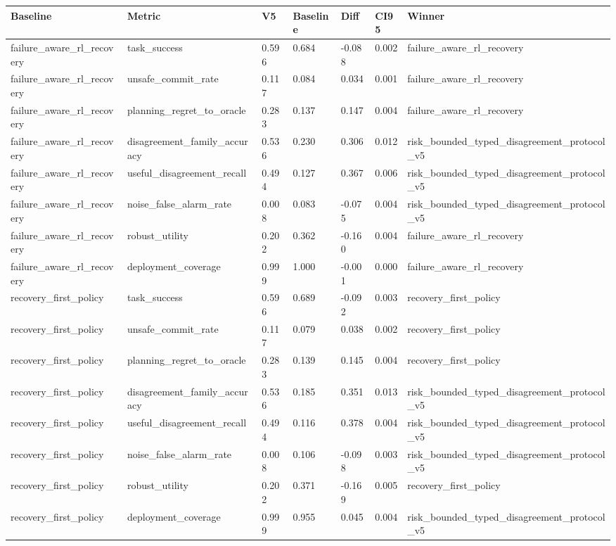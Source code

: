 \begin{tabular}{lllllll}
\toprule
Baseline & Metric & V5 & Baseline & Diff & CI95 & Winner \\
\midrule
failure\_aware\_rl\_recovery & task\_success & 0.596 & 0.684 & -0.088 & 0.002 & failure\_aware\_rl\_recovery \\
failure\_aware\_rl\_recovery & unsafe\_commit\_rate & 0.117 & 0.084 & 0.034 & 0.001 & failure\_aware\_rl\_recovery \\
failure\_aware\_rl\_recovery & planning\_regret\_to\_oracle & 0.283 & 0.137 & 0.147 & 0.004 & failure\_aware\_rl\_recovery \\
failure\_aware\_rl\_recovery & disagreement\_family\_accuracy & 0.536 & 0.230 & 0.306 & 0.012 & risk\_bounded\_typed\_disagreement\_protocol\_v5 \\
failure\_aware\_rl\_recovery & useful\_disagreement\_recall & 0.494 & 0.127 & 0.367 & 0.006 & risk\_bounded\_typed\_disagreement\_protocol\_v5 \\
failure\_aware\_rl\_recovery & noise\_false\_alarm\_rate & 0.008 & 0.083 & -0.075 & 0.004 & risk\_bounded\_typed\_disagreement\_protocol\_v5 \\
failure\_aware\_rl\_recovery & robust\_utility & 0.202 & 0.362 & -0.160 & 0.004 & failure\_aware\_rl\_recovery \\
failure\_aware\_rl\_recovery & deployment\_coverage & 0.999 & 1.000 & -0.001 & 0.000 & failure\_aware\_rl\_recovery \\
recovery\_first\_policy & task\_success & 0.596 & 0.689 & -0.092 & 0.003 & recovery\_first\_policy \\
recovery\_first\_policy & unsafe\_commit\_rate & 0.117 & 0.079 & 0.038 & 0.002 & recovery\_first\_policy \\
recovery\_first\_policy & planning\_regret\_to\_oracle & 0.283 & 0.139 & 0.145 & 0.004 & recovery\_first\_policy \\
recovery\_first\_policy & disagreement\_family\_accuracy & 0.536 & 0.185 & 0.351 & 0.013 & risk\_bounded\_typed\_disagreement\_protocol\_v5 \\
recovery\_first\_policy & useful\_disagreement\_recall & 0.494 & 0.116 & 0.378 & 0.004 & risk\_bounded\_typed\_disagreement\_protocol\_v5 \\
recovery\_first\_policy & noise\_false\_alarm\_rate & 0.008 & 0.106 & -0.098 & 0.003 & risk\_bounded\_typed\_disagreement\_protocol\_v5 \\
recovery\_first\_policy & robust\_utility & 0.202 & 0.371 & -0.169 & 0.005 & recovery\_first\_policy \\
recovery\_first\_policy & deployment\_coverage & 0.999 & 0.955 & 0.045 & 0.004 & risk\_bounded\_typed\_disagreement\_protocol\_v5 \\
\bottomrule
\end{tabular}
